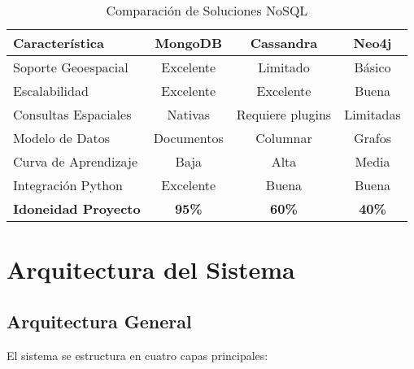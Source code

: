 \documentclass[12pt,a4paper]{article}
\begin{document}
\begin{table}[h]
\centering
\caption{Comparación de Soluciones NoSQL}
\begin{tabular}{@{}lccc@{}}
\toprule
\textbf{Característica} & \textbf{MongoDB} & \textbf{Cassandra} & \textbf{Neo4j} \\ \midrule
Soporte Geoespacial & Excelente & Limitado & Básico \\
Escalabilidad & Excelente & Excelente & Buena \\
Consultas Espaciales & Nativas & Requiere plugins & Limitadas \\
Modelo de Datos & Documentos & Columnar & Grafos \\
Curva de Aprendizaje & Baja & Alta & Media \\
Integración Python & Excelente & Buena & Buena \\
\textbf{Idoneidad Proyecto} & \textbf{95\%} & \textbf{60\%} & \textbf{40\%} \\ \bottomrule
\end{tabular}
\end{table}

\newpage
\section{Arquitectura del Sistema}

\subsection{Arquitectura General}

El sistema se estructura en cuatro capas principales:
\end{document}
